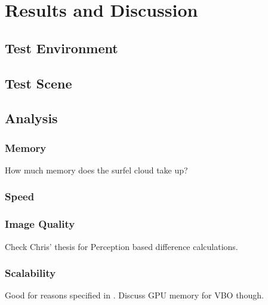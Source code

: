 \chapter{Results and Discussion}

\section{Test Environment}

\section{Test Scene}

\section{Analysis}

\subsection{Memory}
How much memory does the surfel cloud take up?

\subsection{Speed}

\subsection{Image Quality}
Check Chris' thesis for Perception based difference calculations.

\subsection{Scalability}
Good for reasons specified in \cite{bib:christensen2008}. Discuss GPU memory for VBO though.

